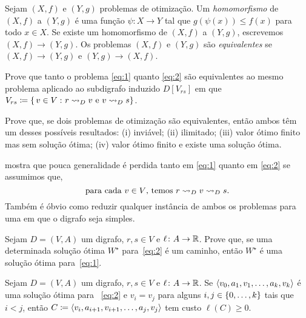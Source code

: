 \documentclass[10pt,reqno]{amsart}
\begin{document}
\begin{definition*}
  Sejam \((X,f)\) e \((Y,g)\) problemas de otimização.  Um
  \emph{homomorfismo} de \((X,f)\) a \((Y,g)\) é uma função
  \(\psi \colon X \to Y\) tal que \(g(\psi(x)) \leq f(x)\) para todo
  \(x \in X\).  Se existe um homomorfismo de \((X,f)\) a
  \((Y,g)\), escrevemos \((X,f) \to (Y,g)\).  Os problemas \((X,f)\) e
  \((Y,g)\) são \emph{equivalentes} se \((X,f) \to (Y,g)\) e
  \((Y,g) \to (X,f)\).
\end{definition*}

\begin{exercise}
  \label{ex:1}
  Prove que tanto o problema \eqref{eq:1} quanto \eqref{eq:2} são equivalentes
  ao mesmo problema aplicado ao subdigrafo induzido \(D[V_{rs}]\)
  em que
  \(V_{rs} \coloneqq \{\,{v \in V}\,\colon{r \rightsquigarrow_D v \text{ e }v
    \rightsquigarrow_D s}\}\).
\end{exercise}

\begin{exercise}
  Prove que, se dois problemas de otimização são equivalentes, então
  ambos têm um desses possíveis resultados: (i) inviável; (ii) ilimitado;
  (iii) valor ótimo finito mas sem solução ótima; (iv) valor ótimo finito
  e existe uma solução ótima.
\end{exercise}

 mostra que pouca generalidade é perdida tanto em
\eqref{eq:1} quanto em \eqref{eq:2} se assumimos que,
\begin{equation}
  \label{eq:3}
  \text{para cada \(v \in V\), temos \(r \rightsquigarrow_D v \rightsquigarrow_D s\).}
\end{equation}
Também é óbvio como reduzir qualquer instância de ambos os problemas para 
uma em que o digrafo seja simples.

\begin{exercise}
  \label{ex:2}
  Sejam \(D = (V,A)\) um digrafo, \(r,s \in V\) e
  \(\ell \colon A \to \mathbb{R}\).  Prove que, se uma determinada solução
  ótima \(W^\star\) para~\eqref{eq:2} é um caminho, então \(W^\star\) é uma
  solução ótima para~\eqref{eq:1}.
\end{exercise}

\begin{exercise}
  \label{ex:3}
  Sejam \(D = (V,A)\) um digrafo, \(r,s \in V\) e
  \(\ell \colon A \to \mathbb{R}\).  Se
  \(\langle v_0,a_1,v_1,\dotsc,a_k,v_k\rangle\) é uma solução ótima para
  ~\eqref{eq:2} e \(v_i = v_j\) para alguns
  \(i,j \in \{0,\dotsc,k\}\) tais que \(i < j\), então
  \(C \coloneqq \langle v_i,a_{i+1},v_{i+1},\dotsc,a_j,v_j\rangle\) tem custo
  \(\ell(C) \geq 0\).
\end{exercise}
\end{document}
